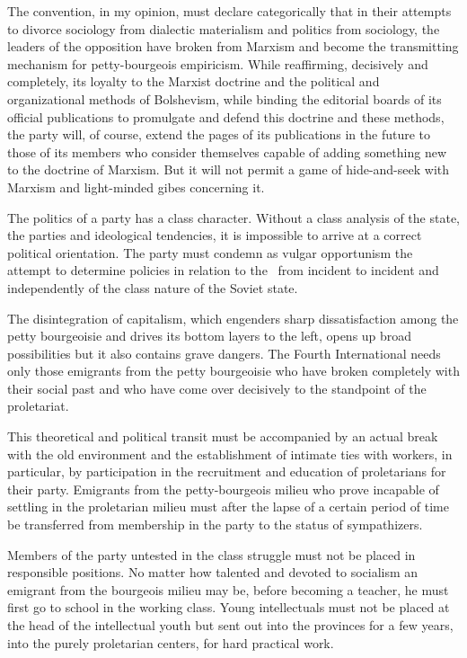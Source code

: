 The convention, in my opinion, must declare categorically that in their attempts to divorce sociology from dialectic materialism and politics from sociology, the leaders of the opposition have broken from Marxism and become the transmitting mechanism for petty-bourgeois empiricism. While reaffirming, decisively and completely, its loyalty to the Marxist doctrine and the political and organizational methods of Bolshevism, while binding the editorial boards of its official publications to promulgate and defend this doctrine and these methods, the party will, of course, extend the pages of its publications in the future to those of its members who consider themselves capable of adding something new to the doctrine of Marxism. But it will not permit a game of hide-and-seek with Marxism and light-minded gibes concerning it.

The politics of a party has a class character. Without a class analysis of the state, the parties and ideological tendencies, it is impossible to arrive at a correct political orientation. The party must condemn as vulgar opportunism the attempt to determine policies in relation to the \USSR\ from incident to incident and independently of the class nature of the Soviet state.
\nowidow

The disintegration of capitalism, which engenders sharp dissatisfaction among the petty bourgeoisie and drives its bottom layers to the left, opens up broad possibilities but it also contains grave dangers. The Fourth International needs only those emigrants from the petty bourgeoisie who have broken completely with their social past and who have come over decisively to the standpoint of the proletariat.

This theoretical and political transit must be accompanied by an actual break with the old environment and the establishment of intimate ties with workers, in particular, by participation in the recruitment and education of proletarians for their party. Emigrants from the petty-bourgeois milieu who prove incapable of settling in the proletarian milieu must after the lapse of a certain period of time be transferred from membership in the party to the status of sympathizers.

Members of the party untested in the class struggle must not be placed in responsible positions. No matter how talented and devoted to socialism an emigrant from the bourgeois milieu may be, before becoming a teacher, he must first go to school in the working class. Young intellectuals must not be placed at the head of the intellectual youth but sent out into the provinces for a few years, into the purely proletarian centers, for hard practical work.

